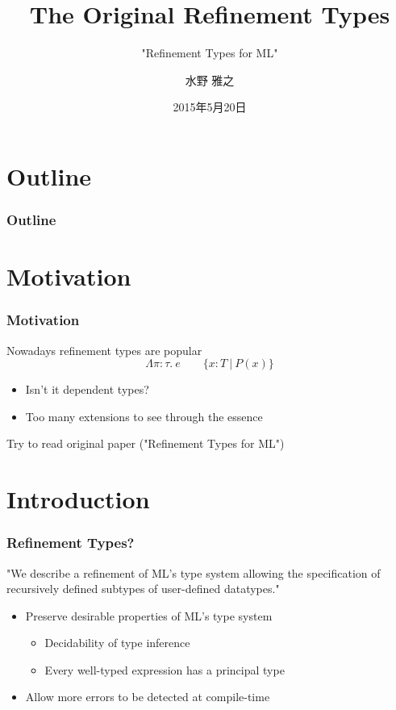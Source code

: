 \documentclass[dvipdfmx,cjk,xcolor=dvipsnames,envcountsect,notheorems,aspectratio=169]{beamer}
\title{The Original Refinement Types}
\subtitle{"Refinement Types for ML"}
\author{水野 雅之}
\date{2015年5月20日}
\theoremstyle{definition}
\begin{document}
\frame[plain]{\titlepage}

\section*{Outline}

\begin{frame}
  \frametitle{Outline}
  \tableofcontents[sectionstyle=show,subsectionstyle=hide]
\end{frame}

\section{Motivation}

\begin{frame}
  \frametitle{Motivation}
	\Large Nowadays refinement types are popular
	\[\Lambda \pi:\tau.~e\qquad\{x : T~|~P(x)\}\]
	\begin{itemize}
		\item Isn't it dependent types?
		\item Too many extensions to see through the essence
	\end{itemize}
	\vfill
	Try to read original paper ("Refinement Types for ML")
\end{frame}

\section{Introduction}

\begin{frame}
	\frametitle{Refinement Types?}
	\Large "We describe a refinement of ML's type system
	allowing the specification of recursively defined subtypes of user-defined datatypes."
	\begin{itemize}
		\item Preserve desirable properties of ML's type system
			\begin{itemize}
				\item Decidability of type inference
				\item Every well-typed expression has a principal type
			\end{itemize}
		\item Allow more errors to be detected at compile-time
	\end{itemize}
\end{frame}
\end{document}
